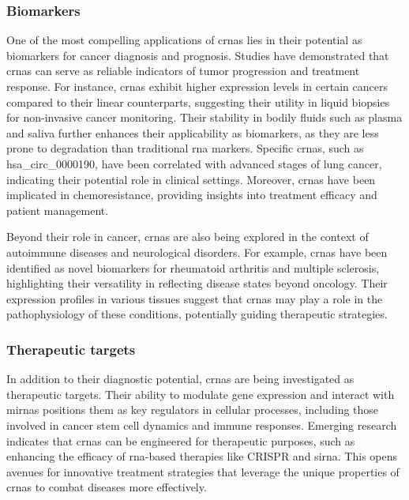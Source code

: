 \subsubsection{Biomarkers}
One of the most compelling applications of \glspl{crna} lies in their potential
as biomarkers for cancer diagnosis and prognosis.
Studies have demonstrated that \glspl{crna} can serve as reliable indicators of
tumor progression and treatment response.
For instance, \glspl{crna} exhibit higher expression levels in certain cancers
compared to their linear counterparts, suggesting their utility in liquid
biopsies for non-invasive cancer
monitoring\supercite{bao_prognostic_2020,ren_construction_2017}.
Their stability in bodily fluids such as plasma and saliva further enhances
their applicability as biomarkers, as they are less prone to degradation than
traditional \gls{rna}
markers\supercite{bao_prognostic_2020,zhang_circular_2018}.
Specific \glspl{crna}, such as hsa\_circ\_0000190, have been correlated with
advanced stages of lung cancer, indicating their potential role in clinical
settings\supercite{luo_plasma_2020}.
Moreover, \glspl{crna} have been implicated in chemoresistance, providing
insights into treatment efficacy and patient
management\supercite{geng_function_2018,feng_functions_2019}.

Beyond their role in cancer, \glspl{crna} are also being explored in the
context of autoimmune diseases and neurological disorders.
For example, \glspl{crna} have been identified as novel biomarkers for
rheumatoid arthritis and multiple sclerosis, highlighting their versatility in
reflecting disease states beyond
oncology\supercite{ouyang_identification_2021,he_exosomal_2019}.
Their expression profiles in various tissues suggest that \glspl{crna} may play
a role in the pathophysiology of these conditions, potentially guiding
therapeutic strategies\supercite{mohammed_circular_2023}.

\subsubsection{Therapeutic targets}
In addition to their diagnostic potential, \glspl{crna} are being investigated
as therapeutic targets.
Their ability to modulate gene expression and interact with \glspl{mirna}
positions them as key regulators in cellular processes, including those
involved in cancer stem cell dynamics and immune
responses\supercite{cheng_emerging_2023}.
Emerging research indicates that \glspl{crna} can be engineered for therapeutic
purposes, such as enhancing the efficacy of \gls{rna}-based therapies like
CRISPR and \gls{sirna}\supercite{wesselhoeft_engineering_2018}.
This opens avenues for innovative treatment strategies that leverage the unique
properties of \glspl{crna} to combat diseases more effectively.
